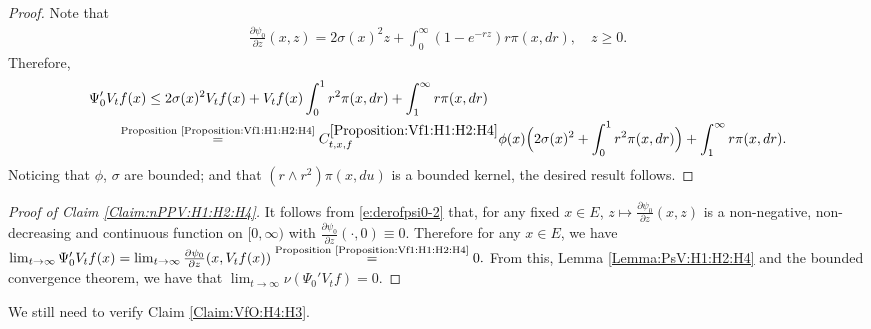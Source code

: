 \documentclass[12pt,a4paper]{amsart}
\numberwithin{equation}{section}
\theoremstyle{plain}
\theoremstyle{definition}
\theoremstyle{remark}
\newcounter{N}
\newcounter{n}[N]
\begin{document}
\begin{proof}
Note that
\begin{align}\label{e:derofpsi0-2}
 \frac{\partial \psi_0 }{ \partial z} (x,z)
= 2\sigma (x)^2 z + \int_0^\infty (1 - e^{- rz}) r \pi(x,dr),
 \quad z\geq 0.
  \end{align}
Therefore,
\begin{align}
  \MoveEqLeft \Psi_0' V_tf(x)
  \leq 2\sigma (x)^2 V_t f(x) + V_t f(x) \int_0^1 r^2 \pi(x,dr) + \int_1^\infty r \pi(x,dr)
  \\&\overset{\text{Proposition \ref{Proposition:Vf1:H1:H2:H4}}}= C^{\ref{Proposition:Vf1:H1:H2:H4}}_{t,x,f} \phi(x) \Big(2\sigma (x)^2 +\int_0^1 r^2 \pi(x,dr) \Big)+ \int_1^\infty r \pi(x,dr).
  \end{align}
  Noticing that $\phi$, $\sigma$ are bounded; and that $(r\wedge r^2)\pi(x,du)$ is a bounded kernel, the desired result follows.
\end{proof}
\begin{proof}[{Proof of Claim \ref{Claim:nPPV:H1:H2:H4}}]
It follows from \eqref{e:derofpsi0-2} that,
	for any fixed $x\in E$, $z\mapsto \frac{\partial \psi_0}{\partial z} (x,z)$ is a non-negative, non-decreasing and continuous function on $[0,\infty)$ with $\frac{\partial \psi_0}{\partial z} (\cdot,0) \equiv 0$.
	Therefore for any $x\in E$, we have
	$\lim_{t\to \infty} \Psi_0' V_tf(x)
	=\lim_{t\to \infty} \frac{\partial \psi_0}{ \partial z}(x,V_tf(x))
	\overset{\text{Proposition \ref{Proposition:Vf1:H1:H2:H4}}}{=} 0. $
From this, Lemma \ref{Lemma:PsV:H1:H2:H4} and the bounded convergence theorem, we have that
	$\lim_{t\to \infty}\nu(\Psi_0' V_tf)  = 0. $
\end{proof}
	We still need to verify Claim \ref{Claim:VfO:H4:H3}.
\end{document}
